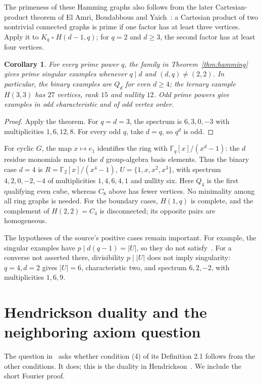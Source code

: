 \documentclass[10pt]{article}
\newtheorem{corollary}{Corollary}
\newcommand{\F}{\mathbb F}
\begin{document}
The primeness of these Hamming graphs also follows from the later
Cartesian-product theorem of El Amri, Boudabbous and
Yaich~\cite[Theorem 1.2]{Cartesian}: a Cartesian product of two
nontrivial connected graphs is prime if one factor has at least three
vertices. Apply it to $K_q\mathbin\square H(d-1,q)$; for $q=2$
and $d\geq3$, the second factor has at least four vertices.

\begin{corollary}\label{cor:examples}
For every prime power $q$, the family in Theorem~\ref{thm:hamming}
gives prime singular examples whenever $q\mid d$ and $(d,q)\neq(2,2)$.
In particular, the binary examples are $Q_d$ for even $d\geq4$;
the ternary example $H(3,3)$ has $27$ vertices, rank $15$ and
nullity $12$. Odd prime powers give examples in odd characteristic
and of odd vertex order.
\end{corollary}
\begin{proof}
Apply the theorem. For $q=d=3$, the spectrum is
$6,3,0,-3$ with multiplicities $1,6,12,8$.
For every odd $q$, take $d=q$, so $q^d$ is odd.
\end{proof}

For cyclic $G$, the map $x\mapsto e_1$ identifies the ring with
$\F_q[x]/(x^d-1)$: the $d$ residue monomials map to the $d$
group-algebra basis elements. Thus the binary case $d=4$ is
$R=\F_2[x]/(x^4-1)$, $U=\{1,x,x^2,x^3\}$, with spectrum
$4,2,0,-2,-4$ of multiplicities $1,4,6,4,1$ and nullity six.
Here $Q_4$ is the first qualifying even cube, whereas $C_8$ above
has fewer vertices. No minimality among all ring graphs is needed.
For the boundary cases, $H(1,q)$ is complete, and the complement
of $H(2,2)=C_4$ is disconnected; its opposite pairs are homogeneous.

The hypotheses of the source's positive cases remain important.
For example, the singular examples have $p\mid d(q-1)=|U|$,
so they do not satisfy~\cite[Proposition 4.20]{NT}.
For a converse not asserted there, divisibility $p\mid|U|$ does
not imply singularity: $q=4,d=2$ gives $|U|=6$, characteristic two,
and spectrum $6,2,-2$, with multiplicities $1,6,9$.

\section{Hendrickson duality and the neighboring axiom question}
The question in~\cite[Remark 2.2, p.~4]{NT} asks whether condition
(4) of its Definition 2.1 follows from the other conditions. It does;
this is the duality in Hendrickson~\cite[Theorem 10.3 and the paragraph
following Corollary 10.5]{Hendrickson}. We include the short Fourier proof.
\end{document}
